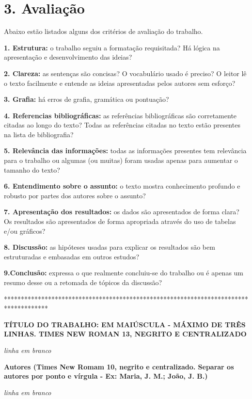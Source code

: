 \documentclass[a4paper,10pt]{article}
\begin{document}
   \section* {3. Avaliação}
   \noindent

    Abaixo estão listados alguns dos critérios de avaliação do trabalho.

    \textbf{1. Estrutura:} o trabalho seguiu a formatação requisitada? Há lógica na apresentação e desenvolvimento das ideias?

    \textbf{2. Clareza:} as sentenças são concisas? O vocabulário usado é preciso? O leitor lê o texto facilmente e entende as ideias apresentadas pelos autores sem esforço?

    \textbf{3. Grafia:} há erros de grafia, gramática ou pontuação?

    \textbf{4. Referencias bibliográficas:} as referências bibliográficas são corretamente citadas ao longo do texto? Todas as referências citadas no texto estão presentes na lista de bibliografia?

    \textbf{5. Relevância das informações:} todas as informações presentes tem relevância para o trabalho ou algumas (ou muitas) foram usadas apenas para aumentar o tamanho do texto?

    \textbf{6. Entendimento sobre o assunto:} o texto mostra conhecimento profundo e robusto por partes dos autores sobre o assunto?

    \textbf{7. Apresentação dos resultados:} os dados são apresentados de forma clara? Os resultados são apresentados de forma apropriada através do uso de tabelas e/ou gráficos?

    \textbf{8. Discussão:} as hipóteses usadas para explicar os resultados são bem estruturadas e embasadas em outros estudos?

     \textbf{9.Conclusão:} expressa o que realmente concluiu-se do trabalho ou é apenas um resumo desse ou a retomada de tópicos da discussão?

\vspace{10ex}

*************************************************************************************

  {\centering
  \textbf{TÍTULO DO TRABALHO: EM MAIÚSCULA - MÁXIMO DE TRÊS LINHAS. TIMES NEW ROMAN 13, NEGRITO E  CENTRALIZADO}

  \textit{linha em branco}

  \textbf{Autores (Times New Romam 10, negrito e centralizado. Separar os autores por ponto e vírgula - Ex: Maria, J. M.; João, J. B.)}

  \textit{linha em branco}

  \par
  }
\end{document}
